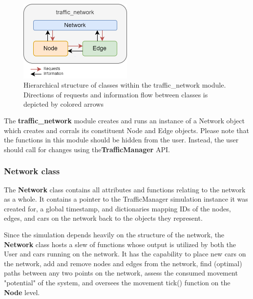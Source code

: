 \begin{figure}[H]
    \centering
	\includegraphics[width=0.5\textwidth]{tex files/Figures/traffic_network_module.png}
	\caption[Network Module:  traffic\_network]{Hierarchical structure of classes within the traffic\_network module.  Directions of requests and information flow between classes is depicted by colored arrows }
	\label{fig:network_module}
\end{figure}

\par The \textbf{traffic\_network} module creates and runs an instance of a Network object which creates and corrals its constituent Node and Edge objects.  Please note that the functions in this module should be hidden from the user.  Instead, the user should call for changes using the\textbf{TrafficManager} API. \\

\subsubsection{Network class}

\par The \textbf{Network} class contains all attributes and functions relating to the network as a whole.  It contains a pointer to the TrafficManager simulation instance it was created for, a global timestamp, and dictionaries mapping IDs of the nodes, edges, and cars on the network back to the objects they represent. \\

\par Since the simulation depends heavily on the structure of the network, the \textbf{Network} class hosts a slew of functions whose output is utilized by both the User and cars running on the network.  It has the capability to place new cars on the network, add and remove nodes and edges from the network, find (optimal) paths between any two points on the network, assess the consumed movement "potential" of the system, and oversees the movement tick() function on the \textbf{Node} level. \\

